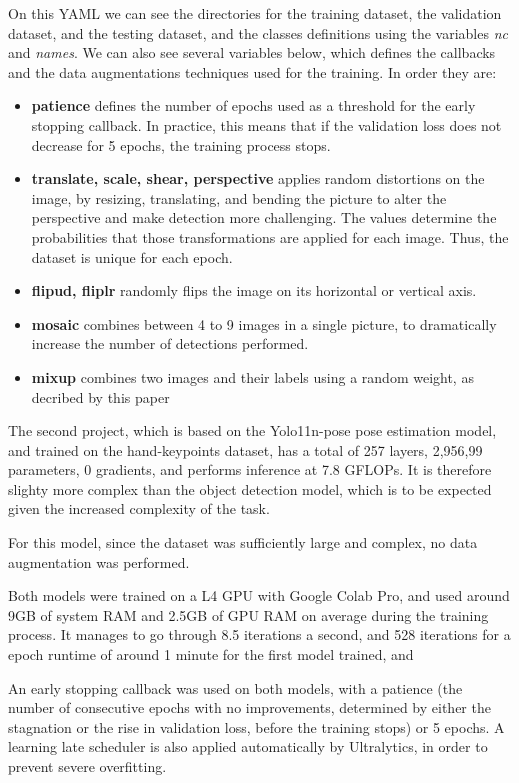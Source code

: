 \documentclass[12pt]{article}
\begin{document}
On this YAML we can see the directories for the training dataset, the validation dataset, and the testing dataset, and the classes definitions using the variables \textit{nc} and \textit{names}. We can also see several variables below, which defines the callbacks and the data augmentations techniques used for the training. In order they are:
\begin{itemize}
  \item \textbf{patience} defines the number of epochs used as a threshold for the early stopping callback. In practice, this means that if the validation loss does not decrease for 5 epochs, the training process stops.
  \item \textbf{translate, scale, shear, perspective} applies random distortions on the image, by resizing, translating, and bending the picture to alter the perspective and make detection more challenging. The values determine the probabilities that those transformations are applied for each image. Thus, the dataset is unique for each epoch.
  \item \textbf{flipud, fliplr} randomly flips the image on its horizontal or vertical axis.
  \item \textbf{mosaic} combines between 4 to 9 images in a single picture, to dramatically increase the number of detections performed.
  \item \textbf{mixup} combines two images and their labels using a random weight, as decribed by this paper ~\cite{DBLP}
\end{itemize}

The second project, which is based on the Yolo11n-pose pose estimation model, and trained on the hand-keypoints dataset, has a total of 257 layers, 2,956,99 parameters, 0 gradients, and performs inference at 7.8 GFLOPs. It is therefore slighty more complex than the object detection model, which is to be expected given the increased complexity of the task.

For this model, since the dataset was sufficiently large and complex, no data augmentation was performed.

Both models were trained on a L4 GPU with Google Colab Pro, and used around 9GB of system RAM and 2.5GB of GPU RAM on average during the training process. It manages to go through 8.5 iterations a second, and 528 iterations for a epoch runtime of around 1 minute for the first model trained, and 

An early stopping callback was used on both models, with a patience (the number of consecutive epochs with no improvements, determined by either the stagnation or the rise in validation loss, before the training stops) or 5 epochs. A learning late scheduler is also applied automatically by Ultralytics, in order to prevent severe overfitting.
\end{document}
